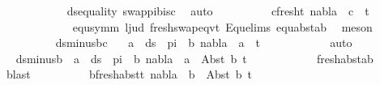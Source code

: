 \begin{isabellebody}
\ \ \ \ \ \ \ \ \ \ \isamarkupfalse%
\ ds{\isacharunderscore}{\kern0pt}equality\ swap{\isacharunderscore}{\kern0pt}pi{\isacharunderscore}{\kern0pt}b{\isacharunderscore}{\kern0pt}is{\isacharunderscore}{\kern0pt}c\ \isamarkupfalse%
\ auto\isanewline
\ \ \ \ \ \ \ \ \isamarkupfalse%
\ c{\isacharunderscore}{\kern0pt}fresh{\isacharunderscore}{\kern0pt}t{}{\isacharcolon}{\kern0pt}\ {\isachardoublequoteopen}nabla\ {\isasymturnstile}\ c\ {\isasymsharp}\ t{}{\isachardoublequoteclose}\isanewline
\ \ \ \ \ \ \ \ \ \ \isamarkupfalse%
\ {}\ equ{\isacharunderscore}{\kern0pt}symm\ l{}{\isacharunderscore}{\kern0pt}jud\ fresh{\isacharunderscore}{\kern0pt}swap{\isacharunderscore}{\kern0pt}eqvt\ Equ{\isacharunderscore}{\kern0pt}elims\ equ{\isacharunderscore}{\kern0pt}abst{\isacharunderscore}{\kern0pt}ab\ \isamarkupfalse%
\ meson\isanewline
\ \ \ \ \ \ \ \ \isamarkupfalse%
\ ds{\isacharunderscore}{\kern0pt}minus{\isacharunderscore}{\kern0pt}bc\ \isamarkupfalse%
\ {\isachardoublequoteopen}{\isasymforall}\ a\ {\isasymin}\ ds\ {\isacharbrackleft}{\kern0pt}{\isacharbrackright}{\kern0pt}\ pi\ {\isacharminus}{\kern0pt}\ {\isacharbraceleft}{\kern0pt}b{\isacharbraceright}{\kern0pt}{\isachardot}{\kern0pt}\ nabla\ {\isasymturnstile}\ a\ {\isasymsharp}\ t{}{\isachardoublequoteclose}\isanewline
\ \ \ \ \ \ \ \ \ \ \isamarkupfalse%
\ auto\isanewline
\ \ \ \ \ \ \ \ \isamarkupfalse%
\ \isamarkupfalse%
\ ds{\isacharunderscore}{\kern0pt}minus{\isacharunderscore}{\kern0pt}b{\isacharcolon}{\kern0pt}\ {\isachardoublequoteopen}{\isasymforall}\ a\ {\isasymin}\ ds\ {\isacharbrackleft}{\kern0pt}{\isacharbrackright}{\kern0pt}\ pi\ {\isacharminus}{\kern0pt}\ {\isacharbraceleft}{\kern0pt}b{\isacharbraceright}{\kern0pt}{\isachardot}{\kern0pt}\ nabla\ {\isasymturnstile}\ a\ {\isasymsharp}\ Abst\ b\ t{}{\isachardoublequoteclose}\isanewline
\ \ \ \ \ \ \ \ \ \ \isamarkupfalse%
\ fresh{\isacharunderscore}{\kern0pt}abst{\isacharunderscore}{\kern0pt}ab\ \isamarkupfalse%
\ blast\isanewline
\ \ \ \ \ \ \ \ \isamarkupfalse%
\ b{\isacharunderscore}{\kern0pt}fresh{\isacharunderscore}{\kern0pt}abst{\isacharunderscore}{\kern0pt}t{}{\isacharcolon}{\kern0pt}\ {\isachardoublequoteopen}nabla\ {\isasymturnstile}\ b\ {\isasymsharp}\ Abst\ b\ t{}{\isachardoublequoteclose}\isanewline
\ \ \ \ \ \ \ \ \ \ \isamarkupfalse%

\end{isabellebody}
